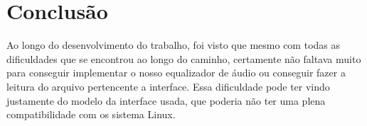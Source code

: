 \documentclass[conference]{IEEEtran}
\begin{document}
\section{Conclusão}

Ao longo do desenvolvimento do trabalho, foi visto que mesmo com todas as dificuldades que se encontrou ao longo do caminho, certamente não faltava muito para conseguir implementar o nosso equalizador de áudio ou conseguir fazer a leitura do arquivo pertencente a interface. Essa dificuldade pode ter vindo justamente do modelo da interface usada, que poderia não ter uma plena compatibilidade com os sistema Linux. 








\end{document}
